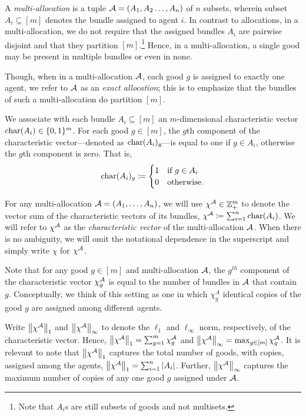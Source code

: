  
A \textit{multi-allocation} is a tuple $\mathcal{A}=(A_1,A_2\dots,A_n)$ of $n$ subsets, wherein subset $A_i \subseteq [m]$ denotes the bundle assigned to agent $i$. In contrast to allocations, in a multi-allocation, we do not require that the assigned bundles $A_i$ are pairwise disjoint and that they partition $[m]$.\footnote{Note that $A_i$s are still subsets of goods and not multisets.} Hence, in a multi-allocation, a single good may be present in multiple bundles or even in none. 

Though, when in a multi-allocation $\mathcal{A}$, each good $g$ is assigned to exactly one agent, we refer to $\mathcal{A}$ as an {\it exact allocation}; this is to emphasize that the bundles of such a multi-allocation do partition $[m]$. 

We associate with each bundle $A_i \subseteq [m]$ an $m$-dimensional characteristic vector $\mathrm{char}(A_i) \in \{0,1\}^m$. For each good $g\in [m]$, the $g$th component of the characteristic vector---denoted as $\mathrm{char}(A_i)_g$---is equal to one if $g \in A_i$, otherwise the $g$th component is zero. That is, 
\begin{align*}
\mathrm{char}(A_i)_g \coloneqq \begin{cases}
    1 & \text{if } g\in A_i \\
    0 & \text{otherwise}.
\end{cases}
\end{align*}

For any multi-allocation $\mathcal{A}=(A_1, \ldots, A_n)$, we will use $\chi^{\mathcal{A}} \in \mathbb{Z}^m_+$ to denote the vector sum of the characteristic vectors of its bundles, $\chi^{\mathcal{A}} \coloneqq \sum_{i=1}^n\mathrm{char}(A_i)$. We will refer to $\chi^{\mathcal{A}}$ as the \textit{characteristic vector} of the multi-allocation $\mathcal{A}$. When there is no ambiguity, we will omit the notational dependence in the superscript and simply write $\chi$ for $\chi^{\mathcal{A}}$.

Note that for any good $g\in [m]$ and multi-allocation $\mathcal{A}$, the $g^{th}$ component of the characteristic vector $\chi^{\mathcal{A}}_g$ is equal to the number of bundles in $\mathcal{A}$ that contain $g$. Conceptually, we think of this setting as one in which $\chi^A_g$ identical copies of the good $g$ are assigned among different agents. 

Write $\left\|\chi^{\mathcal{A}}\right\|_1$ and $\left\|\chi^{\mathcal{A}}\right\|_\infty$ to denote the $\ell_1$ and $\ell_\infty$ norm, respectively, of the characteristic vector. Hence,  $\left\|\chi^{\mathcal{A}}\right\|_1 = \sum_{g=1}^m \chi^{\mathcal{A}}_g$ and $\left\|\chi^{\mathcal{A}}\right\|_\infty = \max_{g\in[m]} \chi^{\mathcal{A}}_g$. It is relevant to note that $\left\|\chi^{\mathcal{A}}\right\|_1$ captures the total number of goods, with copies, assigned among the agents,  $\left\|\chi^{\mathcal{A}}\right\|_1 = \sum_{i=1}^n |A_i|$. Further, $\left\|\chi^{\mathcal{A}}\right\|_\infty$ captures the maximum number of copies of any one good $g$ assigned under $\mathcal{A}$.

